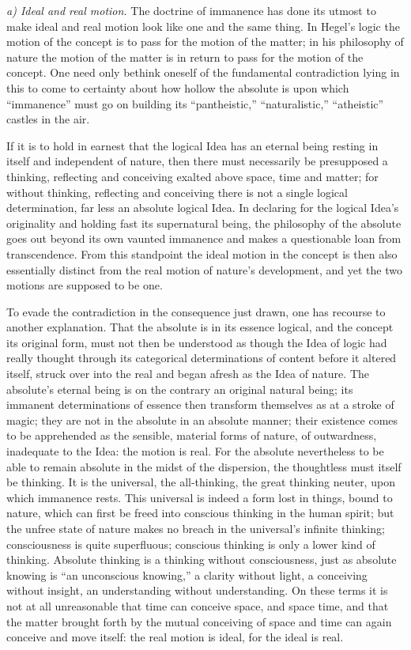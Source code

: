 \documentclass[12pt,a4paper]{book}
\newcommand{\runin}[1]{\emph{#1}\hspace{0.4em}}
\begin{document}
\runin{a) Ideal and real motion.} The doctrine of immanence has done its utmost to make ideal and
real motion look like one and the same thing. In Hegel's logic the motion of the concept is to
pass for the motion of the matter; in his philosophy of nature the motion of the matter is in
return to pass for the motion of the concept. One need only bethink oneself of the fundamental
contradiction lying in this to come to certainty about how hollow the absolute is upon which
``immanence'' must go on building its ``pantheistic,'' ``naturalistic,'' ``atheistic'' castles in
the air.

If it is to hold in earnest that the logical Idea has an eternal being resting in itself and
independent of nature, then there must necessarily be presupposed a thinking, reflecting and
conceiving exalted above space, time and
matter; for without thinking, reflecting and conceiving there is not a single logical
determination, far less an absolute logical Idea. In declaring for the logical Idea's originality
and holding fast its supernatural being, the philosophy of the absolute goes out beyond its own
vaunted immanence and makes a questionable loan from transcendence. From this standpoint the
ideal motion in the concept is then also essentially distinct from the real motion of nature's
development, and yet the two motions are supposed to be one.

To evade the contradiction in the consequence just drawn, one has recourse to another
explanation. That the absolute is in its essence logical, and the concept its original form, must
not then be understood as though the Idea of logic had really thought through its categorical
determinations of content before it altered itself, struck over into the real and began afresh as
the Idea of nature. The absolute's eternal being is on the contrary an original natural being;
its immanent determinations of essence then transform themselves as at a stroke of magic; they
are not in the absolute in an absolute manner; their existence comes to be apprehended as the
sensible, material forms of nature, of outwardness, inadequate to the Idea: the motion is real.
For the absolute nevertheless to be able to remain absolute in the midst of the dispersion, the
thoughtless must itself be thinking. It is the universal, the all-thinking, the great thinking
neuter, upon which immanence rests. This universal is indeed a form lost in things, bound to
nature, which can first be freed into conscious thinking in the human spirit; but the unfree
state of nature makes no breach in the universal's infinite thinking; consciousness is quite
superfluous; conscious thinking is only a lower kind of thinking. Absolute thinking is a thinking
without consciousness, just as absolute knowing is ``an unconscious knowing,'' a clarity without
light, a conceiving without insight,
an understanding without understanding. On these terms it is not at all unreasonable that time
can conceive space, and space time, and that the matter brought forth by the mutual conceiving of
space and time can again conceive and move itself: the real motion is ideal, for the ideal is
real.
\end{document}
